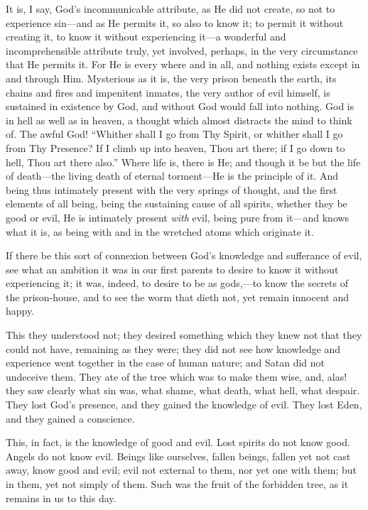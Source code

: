 It is, I say, God's incommunicable attribute, as He did not create,
so not to experience sin—and as He permits it, so also to know it;
to permit it without creating it, to know it without experiencing it—a
wonderful and incomprehensible attribute truly, yet involved, perhaps,
in the very circumstance that He permits it. For He is every where and
in all, and nothing exists except in and through Him. Mysterious as it
is, the very prison beneath the earth, its chains and fires and
impenitent inmates, the very author of evil himself, is sustained in
existence by God, and without God would fall into nothing. God is in
hell as well as in heaven, a thought which almost distracts the mind
to think of. The awful God! ``Whither shall I go from Thy Spirit,
or whither shall I go from Thy Presence? If I climb up into heaven,
Thou art there; if I go down to hell, Thou art there also.'' Where
life is, there is He; and though it be but the life of death—the
living death of eternal torment—He is the principle of it. And being
thus intimately present with the very springs of thought, and the
first elements of all being, being the sustaining cause of all
spirits, whether they be good or evil, He is intimately present \emph{with}
evil, being pure from it—and knows what it is, as being with and in
the wretched atoms which originate it.

If there be this sort of connexion between God's knowledge and
sufferance of evil, see what an ambition it was in our first parents
to desire to know it without experiencing it; it was, indeed, to
desire to be as gods,—to know the secrets of the prison-house, and
to see the worm that dieth not, yet remain innocent and happy.

This they understood not; they desired something which they knew
not that they could not have, remaining as they were; they did not see
how knowledge and experience went together in the case of human
nature; and Satan did not undeceive them. They ate of the tree which
was to make them wise, and, alas! they saw clearly what sin was, what
shame, what death, what hell, what despair. They lost God's presence,
and they gained the knowledge of evil. They lost Eden, and they gained
a conscience.

This, in fact, is the knowledge of good and evil. Lost spirits do
not know good. Angels do not know evil. Beings like ourselves, fallen
beings, fallen yet not cast away, know good and evil; evil not
external to them, nor yet one with them; but in them, yet not simply
of them. Such was the fruit of the forbidden tree, as it remains in us
to this day.

